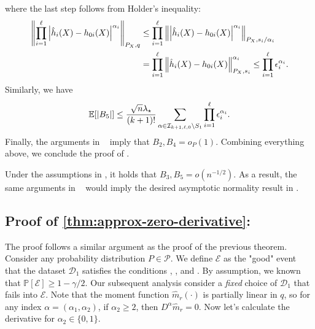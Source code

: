 \documentclass{article}
\def\eps{{\epsilon}}
\def\gD{{\mathcal{D}}}
\def\gE{{\mathcal{E}}}
\def\gI{{\mathcal{I}}}
\def\gP{{\mathcal{P}}}
\newcommand{\E}{\mathbb{E}}
\newcommand\normx[1]{\left\Vert#1\right\Vert}
\newcommand{\ncref}[1]{\cref{#1}: \nameref*{#1}} %
\newcommand{\pcref}[1]{Proof of \ncref{#1}} %
\begin{document}
where the last step follows from Holder's inequality:
\begin{equation}
    \notag
    \begin{aligned}
        \normx{\prod_{i=1}^{\ell}\left|\hat{h}_i(X)-h_{0i}(X)\right|^{\alpha_i}}_{P_X,q} &\leq \prod_{i=1}^{\ell} \normx{\left|\hat{h}_i(X)-h_{0i}(X)\right|^{\alpha_i}}_{P_X,s_i/\alpha_i}  \\
        &= \prod_{i=1}^{\ell} \normx{\hat{h}_i(X)-h_{0i}(X)}_{P_X,s_i}^{\alpha_i} \leq \prod_{i=1}^{\ell}\eps_i^{\alpha_i}.
    \end{aligned}
\end{equation}
Similarly, we have
\begin{equation}
    \notag
    \E[|B_5|] \leq \frac{\sqrt{n}\lambda_{\star}}{(k+1)!}\sum_{\alpha\in\gI_{k+1,\ell,0}\setminus S_1} \prod_{i=1}^{\ell}\eps_i^{\alpha_i}.
\end{equation}
Finally, the arguments in ~\cite[Section A.2]{mackey2018orthogonal} imply that $B_2, B_4=o_P(1)$. Combining everything above, we conclude the proof of .

Under the assumptions in , it holds that $B_3,B_5 = o(n^{-1/2})$. As a result, the same arguments in ~\cite[Section A.2]{mackey2018orthogonal} would imply the desired asymptotic normality result in .

\subsection{\pcref{thm:approx-zero-derivative}}\label{proof:thm:approx-zero-derivative}

The proof follows a similar argument as the proof of the previous theorem. Consider any probability distribution $P\in\gP$. We define $\gE$ as the "good" event that the dataset $\gD_1$ satisfies the conditions , ,  and . By assumption, we known that $\mathbb{P}[\gE] \geq 1-\gamma/2$. Our subsequent analysis consider a \emph{fixed} choice of $\gD_1$ that fails into $\gE$. Note that the moment function $\hat{m}_r(\cdot)$ is partially linear in $q$, so for any index $\alpha=(\alpha_1,\alpha_2)$, if $\alpha_2\geq 2$, then $D^{\alpha}\hat{m}_r = 0$. Now let's calculate the derivative for $\alpha_2\in\{0,1\}$.
\end{document}

